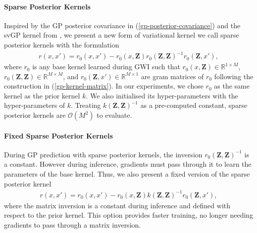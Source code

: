 \documentclass{article}
\numberwithin{equation}{section}
\begin{document}
\paragraph{Sparse Posterior Kernels}
Inspired by the GP posterior covariance in (\ref{gp-posterior-covariance}) and the svGP kernel from \cite{titsias2009variational}, we present a new form of variational kernel we call sparse posterior kernels with the formulation
\begin{align}
    r(x, x') = r_0(x, x') - r_0\left(x, \mathbf{Z}\right) r_0\left(\mathbf{Z}, \mathbf{Z}\right)^{-1} r_0\left(\mathbf{Z}, x'\right),
\end{align}
where $r_0$ is any base kernel learned during GWI such that $r_0\left(x, \mathbf{Z}\right) \in \mathbb{R}^{1 \times M}$, $r_0\left(\mathbf{Z}, \mathbf{Z}\right) \in \mathbb{R}^{M \times M}$, and $r_0\left(\mathbf{Z}, x'\right) \in \mathbb{R}^{M \times 1}$ are gram matrices of $r_0$ following the construction in (\ref{gp-kernel-matrix}).
In our experiments, we chose $r_0$ as the same kernel as the prior kernel $k$. We also initialised its hyper-parameters with the hyper-parameters of $k$.
Treating $k\left(\mathbf{Z}, \mathbf{Z}\right)^{-1}$ as a pre-computed constant, sparse posterior kernels are $\mathcal{O}(M^2)$ to evaluate.

\paragraph{Fixed Sparse Posterior Kernels}
During GP prediction with sparse posterior kernels, the inversion $r_0\left(\mathbf{Z}, \mathbf{Z}\right)^{-1}$ is a constant. However during inference, gradients must pass through it to learn the parameters of the base kernel. Thus, we also present a fixed version of the sparse posterior kernel
\begin{align}
    r(x, x') = r_0(x, x') - r_0\left(x, \mathbf{Z}\right) k\left(\mathbf{Z}, \mathbf{Z}\right)^{-1} r_0\left(\mathbf{Z}, x'\right),
\end{align}
where the matrix inversion is a constant during inference and defined with respect to the prior kernel. This option provides faster training, no longer needing gradients to pass through a matrix inversion.
\end{document}
